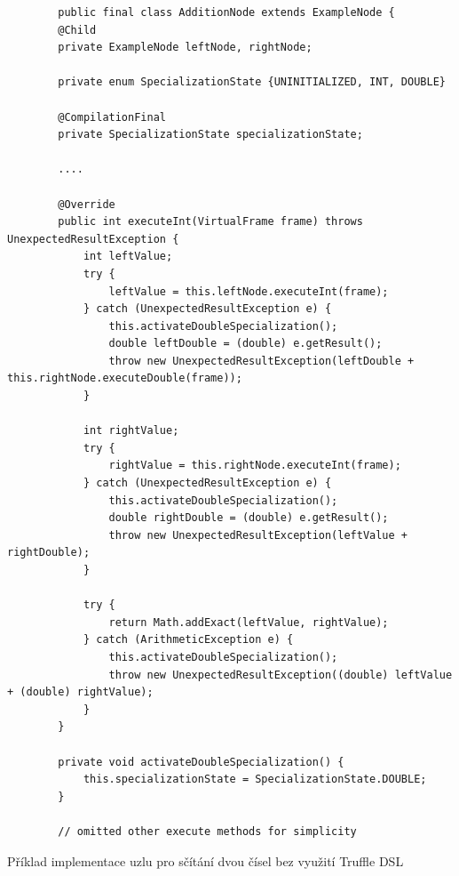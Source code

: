 \documentclass[
  master,
  biblatex,
  figures=true,
  theorems,
  sourcecodes,
  glossaries,
  index
]{kidiplom}
\begin{document}
\begin{listing} 
    \begin{verbatim}
        public final class AdditionNode extends ExampleNode {
        @Child
        private ExampleNode leftNode, rightNode;
    
        private enum SpecializationState {UNINITIALIZED, INT, DOUBLE}
    
        @CompilationFinal
        private SpecializationState specializationState;
    
        ....
        
        @Override
        public int executeInt(VirtualFrame frame) throws UnexpectedResultException {
            int leftValue;
            try {
                leftValue = this.leftNode.executeInt(frame);
            } catch (UnexpectedResultException e) {
                this.activateDoubleSpecialization();
                double leftDouble = (double) e.getResult();
                throw new UnexpectedResultException(leftDouble + this.rightNode.executeDouble(frame));
            }
    
            int rightValue;
            try {
                rightValue = this.rightNode.executeInt(frame);
            } catch (UnexpectedResultException e) {
                this.activateDoubleSpecialization();
                double rightDouble = (double) e.getResult();
                throw new UnexpectedResultException(leftValue + rightDouble);
            }
    
            try {
                return Math.addExact(leftValue, rightValue);
            } catch (ArithmeticException e) {
                this.activateDoubleSpecialization();
                throw new UnexpectedResultException((double) leftValue + (double) rightValue);
            }
        }
    
        private void activateDoubleSpecialization() {
            this.specializationState = SpecializationState.DOUBLE;
        }
    
        // omitted other execute methods for simplicity
    \end{verbatim}
    \caption{Příklad implementace uzlu pro sčítání dvou čísel bez využití Truffle DSL \cite{specialization-intro-adam-ruka}}
    \label{specialization-without-truffle-dsl}
\end{listing}
\end{document}
